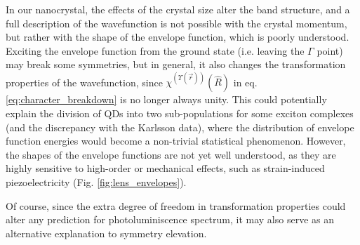 In our nanocrystal, the effects of the crystal size alter the band structure, and a full description of the wavefunction is not possible with the crystal momentum, but rather with the shape of the envelope function, which is poorly understood. Exciting the envelope function from the ground state (i.e. leaving the $\Gamma$ point) may break some symmetries, but in general, it also changes the transformation properties of the wavefunction, since $\chi^{\left(\Upsilon\left(\vec{r}\right)\right)}\left(\hat{R}\right)$ in eq. \ref{eq:character_breakdown} is no longer always unity. This could potentially explain the division of QDs into two sub-populations for some exciton complexes (and the discrepancy with the Karlsson data), where the distribution of envelope function energies would become a non-trivial statistical phenomenon. However, the shapes of the envelope functions are not yet well understood, as they are highly sensitive to high-order or mechanical effects, such as strain-induced piezoelectricity (Fig. \ref{fig:lens_envelopes}).

Of course, since the extra degree of freedom in transformation properties could alter any prediction for photoluminiscence spectrum, it may also serve as an alternative explanation to symmetry elevation.\\

